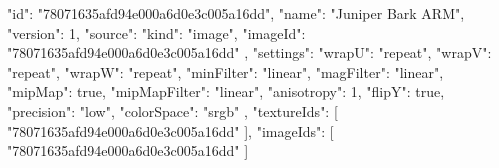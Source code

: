 {
  "id": "78071635afd94e000a6d0e3c005a16dd",
  "name": "Juniper Bark ARM",
  "version": 1,
  "source": {
    "kind": "image",
    "imageId": "78071635afd94e000a6d0e3c005a16dd"
  },
  "settings": {
    "wrapU": "repeat",
    "wrapV": "repeat",
    "wrapW": "repeat",
    "minFilter": "linear",
    "magFilter": "linear",
    "mipMap": true,
    "mipMapFilter": "linear",
    "anisotropy": 1,
    "flipY": true,
    "precision": "low",
    "colorSpace": "srgb"
  },
  "textureIds": [
    "78071635afd94e000a6d0e3c005a16dd"
  ],
  "imageIds": [
    "78071635afd94e000a6d0e3c005a16dd"
  ]
}
